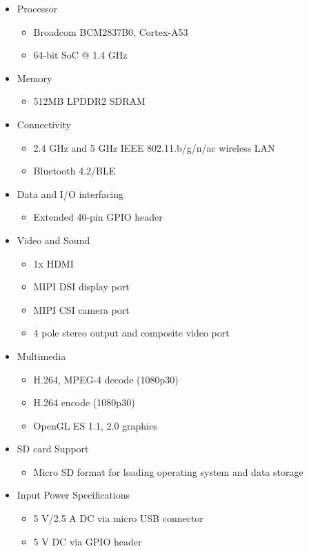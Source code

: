 \documentclass[a4paper,11pt]{report}
\begin{document}
	\begin{itemize}
		\item Processor 
		\begin{itemize}
			\item Broadcom BCM2837B0, Cortex-A53
			\item 64-bit SoC @ 1.4 GHz
		\end{itemize}
		\item Memory
		\begin{itemize}
			\item 512MB LPDDR2 SDRAM
		\end{itemize}
		\item Connectivity
		\begin{itemize}
			\item 2.4 GHz and 5 GHz IEEE 802.11.b/g/n/ac wireless LAN
			\item Bluetooth 4.2/BLE
		\end{itemize}
		\item Data and I/O interfacing
		\begin{itemize}
			\item Extended 40-pin GPIO header
		\end{itemize}
		\item Video and Sound
		\begin{itemize}
			\item 1x HDMI
			\item MIPI DSI display port
			\item MIPI CSI camera port
			\item 4 pole stereo output and composite video port
		\end{itemize}
		\item Multimedia 
		\begin{itemize}
			\item H.264, MPEG-4 decode (1080p30)
			\item H.264 encode (1080p30)
			\item OpenGL ES 1.1, 2.0 graphics
		\end{itemize}
		\item SD card Support
		\begin{itemize}
			\item Micro SD format for loading operating system and data storage
		\end{itemize}
		\item Input Power Specifications
		\begin{itemize}
			\item 5 V/2.5 A DC via micro USB connector
			\item 5 V DC via GPIO header
		\end{itemize}
	\end{itemize}
\end{document}
